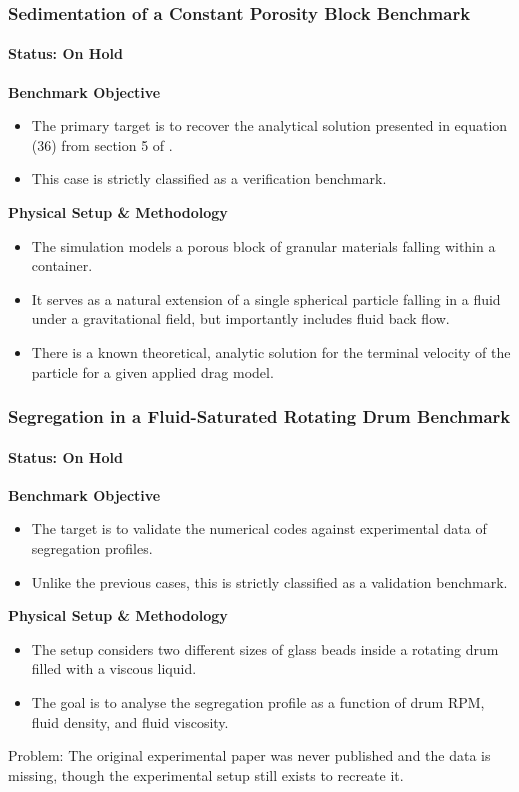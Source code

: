 \begin{frame}
\frametitle{Sedimentation of a Constant Porosity Block Benchmark}
\framesubtitle{Status: On Hold}

    \textbf{Benchmark Objective}
    \begin{itemize}
        \item The primary target is to recover the analytical solution presented in equation (36) from section 5 of \cite{robinson2014fluid}. 
        \item This case is strictly classified as a verification benchmark. 
    \end{itemize}

    \vspace{0.3cm}
    \textbf{Physical Setup \& Methodology}
    \begin{itemize}
        \item The simulation models a porous block of granular materials falling within a container. 
        \item It serves as a natural extension of a single spherical particle falling in a fluid under a gravitational field, but importantly includes fluid back flow. 
        \item There is a known theoretical, analytic solution for the terminal velocity of the particle for a given applied drag model. 
        \end{itemize}
    
    \end{frame}
    
    \begin{frame}
\frametitle{Segregation in a Fluid-Saturated Rotating Drum Benchmark}
\framesubtitle{Status: On Hold}

    \textbf{Benchmark Objective}
    \begin{itemize}
        \item The target is to validate the numerical codes against experimental data of segregation profiles. 
        \item Unlike the previous cases, this is strictly classified as a validation benchmark. 
    \end{itemize}

    \vspace{0.3cm}
    \textbf{Physical Setup \& Methodology}
    \begin{itemize}
        \item The setup considers two different sizes of glass beads inside a rotating drum filled with a viscous liquid. 
        \item The goal is to analyse the segregation profile as a function of drum RPM, fluid density, and fluid viscosity. 
         \end{itemize}
    

    
    \vspace{0.3cm}
    \alert{Problem: The original experimental paper was never published and the data is missing, though the experimental setup still exists to recreate it.} 
\end{frame}


